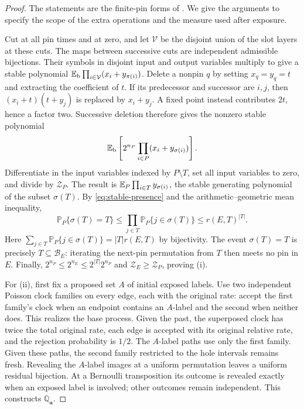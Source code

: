 \begin{proof}
The statements are the finite-pin forms of
\cite[Proposition~2.4, Proposition~2.5, and Lemma~2.3]{BL}.
We give the arguments to specify the scope of the extra operations and
the measure used after exposure.

Cut at all pin times and at zero, and let $\mathcal V$ be the disjoint
union of the slot layers at these cuts.  The maps between successive
cuts are independent admissible bijections.  Their symbols in disjoint
input and output variables multiply to give a stable polynomial
$\mathbb E_{\rm b}\prod_{i\in\mathcal V}(x_i+y_{\pi(i)})$.
Delete a nonpin $q$ by setting $x_q=y_q=t$ and extracting the
coefficient of $t$.  If its predecessor and successor are $i,j$, then
$(x_i+t)(t+y_j)$ is replaced by $x_i+y_j$.  A fixed point instead
contributes $2t$, hence a factor two.  Successive deletion therefore
gives the nonzero stable polynomial
\[
       \mathbb E_{\rm b}\left[2^{n_P}
                         \prod_{i\in P}(x_i+y_{\sigma(i)})\right].
\]
Differentiate in the input variables indexed by $P\setminus T$, set
all input variables to zero, and divide by $\mathcal Z_P$.
The result is
$\mathbb E_P\prod_{i\in T}y_{\sigma(i)}$, the stable generating polynomial
of the subset $\sigma(T)$.  By \eqref{eq:stable-presence} and the arithmetic--geometric
mean inequality,
\[
 \mathbb P_P\{\sigma(T)=T\}
  \le\prod_{j\in T}\mathbb P_P\{j\in\sigma(T)\}
  \le r(E,T)^{|T|}.
\]
Here $\sum_{j\in T}\mathbb P_P\{j\in\sigma(T)\}=|T|r(E,T)$
by bijectivity.  The event $\sigma(T)=T$ is precisely
$T\subseteq\mathcal B_E$: iterating the next-pin permutation from
$T$ then meets no pin in $E$.  Finally,
$2^{n_P}\le2^{n_E}\le2^{|T|}2^{n_P}$ and
$\mathcal Z_E\ge\mathcal Z_P$, proving (i).

For (ii), first fix a proposed set $A$ of initial exposed labels.
Use two independent Poisson clock families on every edge, each with
the original rate: accept the first family's clock when an endpoint
contains an $A$-label and the second when neither does.  This realizes
the base process.  Given the past, the superposed clock has twice the
total original rate, each edge is accepted with its original relative
rate, and the rejection probability is $1/2$.  The $A$-label paths
use only the first family.  Given these paths, the second family
restricted to the hole intervals remains fresh.  Revealing the
$A$-label images at a uniform permutation leaves a uniform residual
bijection.  At a Bernoulli transposition its outcome is revealed
exactly when an exposed label is involved; other outcomes remain
independent.  This constructs $\mathbb Q_{\mathbf a}$.


\end{proof}
